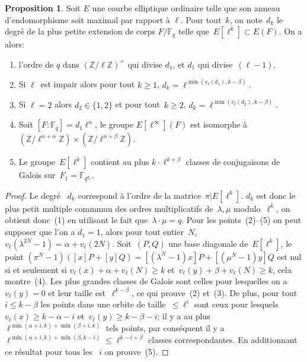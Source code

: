 \documentclass[10pt,a4paper]{book}
\theoremstyle{plain}
\theoremstyle{definition}
\theoremstyle{definition}
\theoremstyle{definition}
\newtheorem{prop}[thm]{Proposition}
\theoremstyle{definition}
\theoremstyle{remark}
\theoremstyle{remark}
\theoremstyle{definition}
\begin{document}
\begin{prop}\label{pro:clas:fro}
Soit $E$ une courbe elliptique ordinaire telle que son anneau d'endomorphisme soit maximal par rapport à $\ell$.
Pour tout~$k$, on note~$d_k$ le degré de la plus petite extension de corps $F/\mathbb{F}_q$
telle que~$E[\ell^k]\subset E(F)$. On  a alors:
\begin{enumerate}
\item l'ordre de $q$ dans $(\mathbb{Z}/ \ell \mathbb{Z})^\times$ qui divise $d_1$,
et $d_1$ qui divise~$(\ell-1)$.
\item Si $\ell$~est impair alors pour tout $k \geqslant 1$,
$ d_k = \ell^{\min (v_{\ell} (d_1), k - \beta)}$.
\item Si $\ell=2$ alors $d_2 \in \{1,2\}$ et pour tout~$k \geqslant 2$,
$d_k = \ell^{\min (v_{\ell} (d_2), k - \beta)}$.
\item Soit $[F:\mathbb{F}_q]=d_1\ell^n$, le groupe $E[\ell^{\infty}](F)$ est isomorphe à~$(\mathbb{Z}/\ell^{n+\alpha} \mathbb{Z}) \times (\mathbb{Z}/\ell^{n+\beta} \mathbb{Z})$.
\item\label{prop:classes:count} Le groupe~$E[\ell^k]$ contient au plus
$k \cdot \ell^{k+\beta}$ classes de conjugaisons de Galois sur~$F_1 = \mathbb{F}_{q^{d_1}}$.
\end{enumerate}
\end{prop}
\begin{proof}
Le degré ~$d_k$ correspond à l'ordre de la matrice~$\pi|E[\ell^k]$.
$d_k$ est donc le plus petit multiple commmun des ordres multiplicatifs
de~$\lambda, \mu$ modulo~$\ell^k$,
on obtient donc~(1) en utilisant le fait que~$\lambda \cdot \mu = q$.
Pour les points~(2)--(5) on peut supposer que l'on a $d_1 = 1$,
alors pour tout entier~$N$, $v_{\ell}(\lambda^{2N}-1) = \alpha + v_{\ell} (2N)$.
Soit~$(P, Q)$ une base diagonale de~$E[\ell^k]$,
le point $(\pi^N - 1) ([x] P + [y] Q) = [(\lambda^N-1) x] P + [(\mu^N-1) y] Q$
est nul si et seulement si $v_{\ell} (x) + \alpha + v_{\ell} (N) \geq k$
et~$v_{\ell} (y) + \beta + v_{\ell} (N) \geq k$, cela montre~(4).
Les plus grandes classes de Galois sont celles pour lesquelles
on a~$v_{\ell} (y) = 0$ et leur taille est~$\ell^{k - \beta}$,
ce qui prouve~(2) et~(3).
De plus, pour tout~$i \leq k-\beta$ les points dans une orbite de taille~$\leqslant \ell^i$
sont ceux pour lesquels~$v_{\ell} (x) \geqslant k - \alpha - i$ et~$v_{\ell} (y) \geqslant k - \beta - i$;
il y a au plus $\ell^{\min(\alpha+i, k) + \min (\beta+i, k)}$ tels points,
par conséquent il y a $\ell^{\min(\alpha+i, k) + \min(\beta, k-i)} \leqslant \ell^{k-i+\beta}$
 classes correspondantes.
En additionnant ce résultat pour tous les ~$i$ on prouve~(5).
\end{proof}
\end{document}
